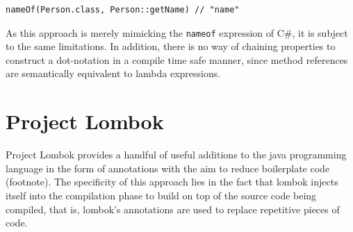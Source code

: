 \begin{verbatim}
nameOf(Person.class, Person::getName) // "name"
\end{verbatim}

As this approach is merely mimicking the \texttt{nameof} expression of C\#, it is subject to the same limitations. In addition, there is no way of chaining properties to construct a dot-notation in a compile time safe manner, since method references are semantically equivalent to lambda expressions.

\section{Project Lombok}
Project Lombok provides a handful of useful additions to the java programming language in the form of annotations with the aim to reduce boilerplate code (footnote). The specificity of this approach lies in the fact that lombok injects itself into the compilation phase to build on top of the source code being compiled, that is, lombok’s annotations are used to replace repetitive pieces of code.

\n

